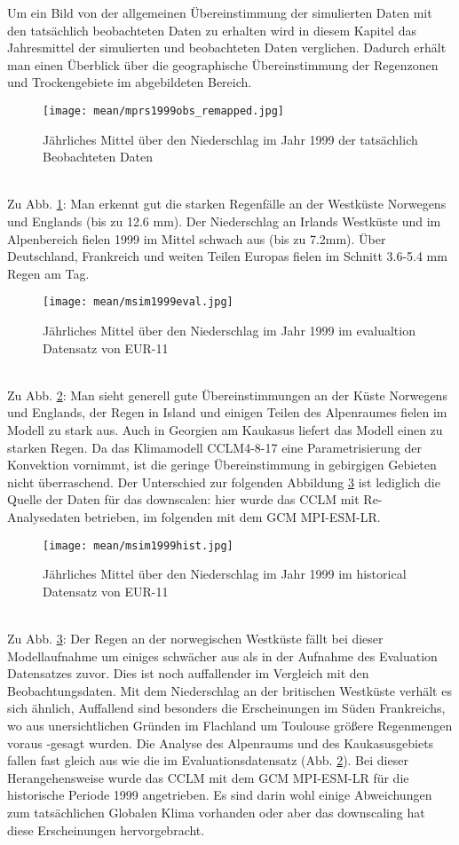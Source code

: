 Um ein Bild von der allgemeinen Übereinstimmung der simulierten Daten mit den tatsächlich beobachteten Daten zu erhalten wird in diesem Kapitel das Jahresmittel der simulierten und beobachteten Daten verglichen. Dadurch erhält man einen Überblick über die geographische Übereinstimmung der Regenzonen und Trockengebiete im abgebildeten Bereich.
\begin{figure}[h]
	\texttt{[image: mean/mprs1999obs\_remapped.jpg]}
	\caption{Jährliches Mittel über den Niederschlag im Jahr 1999 der tatsächlich Beobachteten Daten}
	\label{fig:mobs99}
\end{figure}
\\
Zu Abb. \ref{fig:mobs99}: Man erkennt gut die starken Regenfälle an der Westküste Norwegens und Englands (bis zu 12.6 mm). Der Niederschlag an Irlands Westküste und im Alpenbereich fielen 1999 im Mittel schwach aus (bis zu 7.2mm). Über Deutschland, Frankreich und weiten Teilen Europas fielen im Schnitt 3.6-5.4 mm Regen am Tag.\\
\begin{figure}[h]
	\texttt{[image: mean/msim1999eval.jpg]}
	\caption{Jährliches Mittel über den Niederschlag im Jahr 1999 im evalualtion Datensatz von EUR-11}
	\label{fig:meval99}
\end{figure}
 \\
Zu Abb. \ref{fig:meval99}: Man sieht generell gute Übereinstimmungen an der Küste Norwegens und Englands, der Regen in Island und einigen Teilen des Alpenraumes fielen im Modell zu stark aus. Auch in Georgien am Kaukasus liefert das Modell einen zu starken Regen. Da das Klimamodell CCLM4-8-17 eine Parametrisierung der Konvektion vornimmt, ist die geringe Übereinstimmung in gebirgigen Gebieten nicht überraschend. Der Unterschied zur folgenden Abbildung \ref{fig:mhist99} ist lediglich die Quelle der Daten für das downscalen: hier wurde das CCLM mit Re-Analysedaten betrieben, im folgenden mit dem GCM MPI-ESM-LR.\\
\hfill
\begin{figure}[h]
	\texttt{[image: mean/msim1999hist.jpg]}
	\caption{Jährliches Mittel über den Niederschlag im Jahr 1999 im historical Datensatz von EUR-11}
	\label{fig:mhist99}
\end{figure}
\hfill\\
Zu Abb. \ref{fig:mhist99}: Der Regen an der norwegischen Westküste fällt bei dieser Modellaufnahme um einiges schwächer aus als in der Aufnahme des Evaluation Datensatzes zuvor. Dies ist noch auffallender im Vergleich mit den Beobachtungsdaten. Mit dem Niederschlag an der britischen Westküste verhält es sich ähnlich, Auffallend sind besonders die Erscheinungen im Süden Frankreichs, wo aus unersichtlichen Gründen im Flachland um Toulouse größere Regenmengen \glqq voraus \grqq-gesagt wurden. Die Analyse des Alpenraums und des Kaukasusgebiets fallen fast gleich aus wie die im Evaluationsdatensatz (Abb. \ref{fig:meval99}). Bei dieser Herangehensweise wurde das CCLM mit dem GCM MPI-ESM-LR für die historische Periode 1999 angetrieben. Es sind darin wohl einige Abweichungen zum tatsächlichen Globalen Klima vorhanden oder aber das downscaling hat diese Erscheinungen hervorgebracht.
